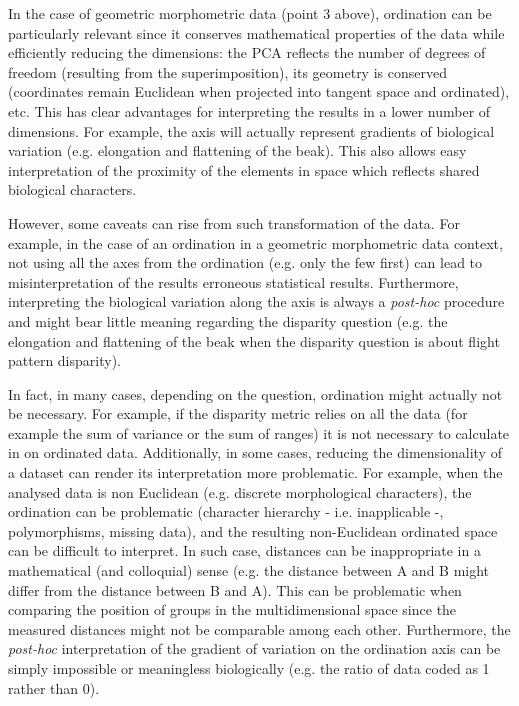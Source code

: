 \documentclass[12pt,letterpaper]{article}
\begin{document}
In the case of geometric morphometric data (point 3 above), ordination can be particularly relevant since it conserves mathematical properties of the data while efficiently reducing the dimensions: the PCA reflects the number of degrees of freedom (resulting from the superimposition), its geometry is conserved (coordinates remain Euclidean when projected into tangent space and ordinated), etc.
This has clear advantages for interpreting the results in a lower number of dimensions.
For example, the axis will actually represent gradients of biological variation (e.g. elongation and flattening of the beak).
This also allows easy interpretation of the proximity of the elements in space which reflects shared biological characters.

However, some caveats can rise from such transformation of the data.
For example, in the case of an ordination in a geometric morphometric data context, not using all the axes from the ordination (e.g. only the few first) can lead to misinterpretation of the results erroneous statistical results.
Furthermore, interpreting the biological variation along the axis is always a \textit{post-hoc} procedure and might bear little meaning regarding the disparity question (e.g. the elongation and flattening of the beak when the disparity question is about flight pattern disparity).

In fact, in many cases, depending on the question, ordination might actually not be necessary.
For example, if the disparity metric relies on all the data (for example the sum of variance or the sum of ranges) it is not necessary to calculate in on ordinated data.
Additionally, in some cases, reducing the dimensionality of a dataset can render its interpretation more problematic.
For example, when the analysed data is non Euclidean (e.g. discrete morphological characters), the ordination can be problematic (character hierarchy - i.e. inapplicable -, polymorphisms, missing data), and the resulting non-Euclidean ordinated space can be difficult to interpret.
In such case, distances can be inappropriate in a mathematical (and colloquial) sense (e.g. the distance between A and B might differ from the distance between B and A).
This can be problematic when comparing the position of groups in the multidimensional space since the measured distances might not be comparable among each other.
Furthermore, the \textit{post-hoc} interpretation of the gradient of variation on the ordination axis can be simply impossible or meaningless biologically (e.g. the ratio of data coded as 1 rather than 0).
\end{document}

